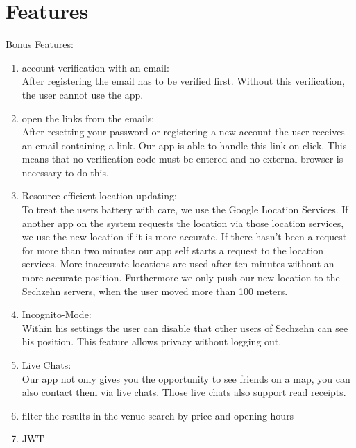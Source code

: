 \documentclass[11pt, accentcolor=tud1c]{tudreport}
\begin{document}
\section{Features}
Bonus Features:
\begin{enumerate}
\item account verification with an email: \\
After registering the email has to be verified first. Without this verification, the user cannot use the app.
\item open the links from the emails: \\
After resetting your password or registering a new account the user receives an email containing a link. Our app is able to handle this link on click. This means that no verification code must be entered and no external browser is necessary to do this.
\item Resource-efficient location updating: \\
To treat the users battery with care, we use the Google Location Services. If another app on the system requests the location via those location services, we use the new location if it is more accurate. If there hasn't been a request for more than two minutes our app self starts a request to the location services. More inaccurate locations are used after ten minutes without an more accurate position. Furthermore we only push our new location to the Sechzehn servers, when the user moved more than 100 meters. 
\item Incognito-Mode: \\
Within his settings the user can disable that other users of Sechzehn can see his position. This feature allows privacy without logging out.
\item Live Chats: \\
Our app not only gives you the opportunity to see friends on a map, you can also contact them via live chats. Those live chats also support read receipts.
\item filter the results in the venue search by price and opening hours
\item JWT
\end{enumerate}
\end{document}
